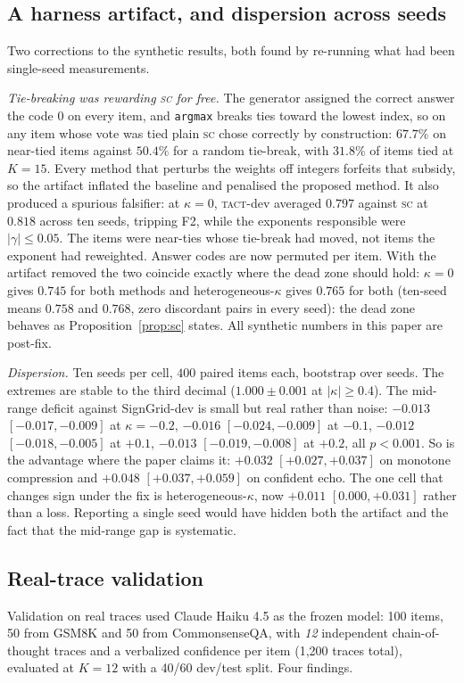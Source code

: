 \documentclass{article}
\newcommand{\SC}{\textsc{sc}}
\newcommand{\TACT}{\textsc{tact}}
\begin{document}
\subsection{A harness artifact, and dispersion across seeds}\label{sec:seeds}
Two corrections to the synthetic results, both found by re-running what had
been single-seed measurements.

\emph{Tie-breaking was rewarding \SC{} for free.} The generator assigned the
correct answer the code $0$ on every item, and \texttt{argmax} breaks ties
toward the lowest index, so on any item whose vote was tied plain \SC{} chose
correctly by construction: $67.7\%$ on near-tied items against $50.4\%$ for a
random tie-break, with $31.8\%$ of items tied at $K{=}15$. Every method that
perturbs the weights off integers forfeits that subsidy, so the artifact
inflated the baseline and penalised the proposed method. It also produced a
spurious falsifier: at $\kappa=0$, \TACT-dev averaged $0.797$ against \SC{} at
$0.818$ across ten seeds, tripping F2, while the exponents responsible were
$|\gamma|\le0.05$. The items were near-ties whose tie-break had moved, not
items the exponent had reweighted. Answer codes are now permuted per item.
With the artifact removed the two coincide exactly where the dead zone
should hold: $\kappa=0$ gives $0.745$ for both methods and
heterogeneous-$\kappa$ gives $0.765$ for both (ten-seed means $0.758$ and
$0.768$, zero discordant pairs in every seed): the dead zone behaves as
Proposition~\ref{prop:sc} states. All synthetic numbers in this paper are
post-fix.

\emph{Dispersion.} Ten seeds per cell, $400$ paired items each, bootstrap over
seeds. The extremes are stable to the third decimal ($1.000\pm0.001$ at
$|\kappa|\ge0.4$). The mid-range deficit against SignGrid-dev is small but
real rather than noise: $-0.013$ $[-0.017,-0.009]$ at $\kappa=-0.2$, $-0.016$
$[-0.024,-0.009]$ at $-0.1$, $-0.012$ $[-0.018,-0.005]$ at $+0.1$, $-0.013$
$[-0.019,-0.008]$ at $+0.2$, all $p<0.001$. So is the advantage where the
paper claims it: $+0.032$ $[+0.027,+0.037]$ on monotone compression and
$+0.048$ $[+0.037,+0.059]$ on confident echo. The one cell that changes sign
under the fix is heterogeneous-$\kappa$, now $+0.011$ $[0.000,+0.031]$ rather
than a loss. Reporting a single seed would have hidden both the artifact and
the fact that the mid-range gap is systematic.


\subsection{Real-trace validation}\label{sec:real}
Validation on real traces used Claude Haiku 4.5 as the frozen model: 100 items, 50 from
GSM8K \citep{gsm8k2021} and 50 from CommonsenseQA, with \emph{12} independent
chain-of-thought traces and a verbalized confidence per item (1{,}200 traces
total), evaluated at $K{=}12$ with a 40/60 dev/test split. Four findings.
\end{document}

